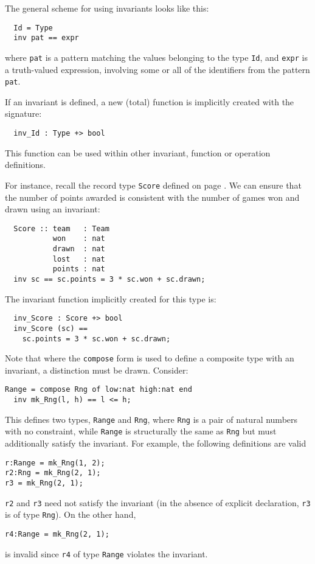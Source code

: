 \documentclass{overturerepchap}
\begin{document}
The general scheme for using invariants looks like this:

\begin{lstlisting}
  Id = Type
  inv pat == expr
\end{lstlisting}

\noindent where {\tt pat} is a pattern matching the values belonging to the type
{\tt Id}, and {\tt expr} is a truth-valued expression, involving some or
all of the identifiers from the pattern {\tt pat}.

If an invariant is defined, a new (total) function is implicitly
created with the signature:
\begin{lstlisting}
  inv_Id : Type +> bool
\end{lstlisting}
This function can be used within other invariant, function or operation
definitions.

For instance, recall the record type \texttt{Score} defined on page
\pageref{scoredef}. We can ensure that the number of points awarded
is consistent with the number of games won and drawn using an invariant:
\begin{lstlisting}
  Score :: team   : Team
           won    : nat
           drawn  : nat
           lost   : nat
           points : nat
  inv sc == sc.points = 3 * sc.won + sc.drawn;
\end{lstlisting}
The invariant function implicitly created for this type is:
\begin{lstlisting}
  inv_Score : Score +> bool
  inv_Score (sc) ==
    sc.points = 3 * sc.won + sc.drawn;
\end{lstlisting}

Note that where the {\tt compose} form is used to define a composite type with an invariant, a distinction must be drawn. Consider:
\begin{lstlisting}
Range = compose Rng of low:nat high:nat end
  inv mk_Rng(l, h) == l <= h;
\end{lstlisting}
This defines two types, {\tt Range} and {\tt Rng}, where {\tt Rng} is a pair of natural numbers with no constraint, while {\tt Range} is structurally the same as {\tt Rng} but must additionally satisfy the invariant.
For example, the following definitions are valid
\begin{lstlisting}
r:Range = mk_Rng(1, 2);
r2:Rng = mk_Rng(2, 1);
r3 = mk_Rng(2, 1);
\end{lstlisting}
{\tt r2} and {\tt r3} need not satisfy the invariant (in the absence of explicit declaration, {\tt r3} is of type {\tt Rng}).
On the other hand,
\begin{lstlisting}
r4:Range = mk_Rng(2, 1);
\end{lstlisting}
is invalid since {\tt r4} of type {\tt Range} violates the invariant.
\end{document}
